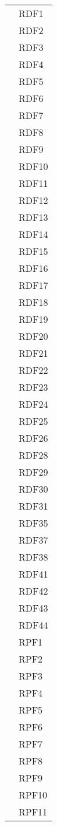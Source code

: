 \begin{longtable}{| p{5cm} | p{5cm} |}
				&	RDF1 \\
				&	RDF2 \\
				&	RDF3 \\
				&	RDF4 \\
				&	RDF5 \\
				&	RDF6 \\
				&	RDF7 \\
				&	RDF8 \\
				&	RDF9 \\
				&	RDF10 \\
				&	RDF11 \\
				&	RDF12 \\
				&	RDF13 \\
				&	RDF14 \\
				&	RDF15 \\
				&	RDF16 \\
				&	RDF17 \\
				&	RDF18 \\
				&	RDF19 \\
				&	RDF20 \\
				&	RDF21 \\
				&	RDF22 \\
				&	RDF23 \\
				&	RDF24 \\
				&	RDF25 \\
				&	RDF26 \\
				&	RDF28 \\
				&	RDF29 \\
				&	RDF30 \\
				&	RDF31 \\
				&	RDF35 \\
				&	RDF37 \\
				&	RDF38 \\
				&	RDF41 \\
				&	RDF42 \\
				&	RDF43 \\
				&	RDF44 \\
				&	RPF1 \\
				&	RPF2 \\
				&	RPF3 \\
				&	RPF4 \\
				&	RPF5 \\
				&	RPF6 \\
				&	RPF7 \\
				&	RPF8 \\
				&	RPF9 \\
				&	RPF10 \\
				&	RPF11 \\

\end{longtable}
